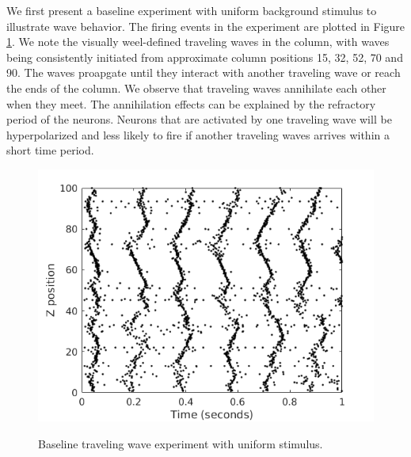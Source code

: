 \documentclass[a4paper,11pt]{article}
\begin{document}
We first present a baseline experiment with uniform background stimulus to illustrate wave behavior. 
The firing events in the experiment are plotted in Figure \ref{fig:baseline}.
We note the visually weel-defined traveling waves in the column, with waves being consistently initiated from approximate column positions 15, 32, 52, 70 and 90.
The waves proapgate until they interact with another traveling wave or reach the ends of the column.
We observe that traveling waves annihilate each other when they meet.
The annihilation effects can be explained by the refractory period of the neurons.
Neurons that are activated by one traveling wave will be hyperpolarized and less likely to fire if another traveling waves arrives within a short time period.
\begin{figure}[!htb]
 \centering
 \caption{Baseline traveling wave experiment with uniform stimulus.}
 \includegraphics[width=\textwidth]{fig/baseline}
 \label{fig:baseline}
\end{figure}
\end{document}
